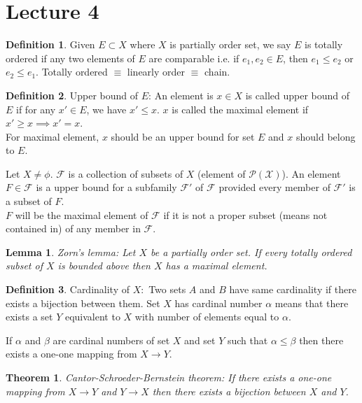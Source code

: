 \documentclass[12pt]{report}
\newtheorem{thm}{Theorem}
\newtheorem{lem}{Lemma}
\theoremstyle{definition}
\newtheorem{defn}{Definition}
\begin{document}
\section*{Lecture 4}
\begin{defn}
    Given $E \subset X$ where $X$ is partially order set, we say $E$ is totally ordered if any two elements of $E$ are comparable i.e. if $e_1,e_2 \in E$, then $e_1 \leq e_2$ or $e_2 \leq e_1$. Totally ordered $\equiv$ linearly order $\equiv$ chain.
\end{defn}
\begin{defn}
    Upper bound of $E$: An element is $x \in X$ is called upper bound of $E$ if for any $x' \in E$, we have $x' \leq x$. $x$ is called the maximal element if $x' \geq x \implies x' = x$.\\
    For maximal element, $x$ should be an upper bound for set $E$ and $x$ should belong to $E$.
\end{defn}
Let $X \neq \phi$. $\mathcal{F}$ is a collection of subsets of $X$ (element of $\mathcal{P(\text{X})}$). An element $F \in \mathcal{F}$ is a upper bound for a subfamily $\mathcal{F'}$ of $\mathcal{F}$ provided every member of $\mathcal{F'}$ is a subset of $F$.\\
$F$ will be the maximal element of $\mathcal{F}$ if it is not a proper subset (means not contained in) of any member in $\mathcal{F}$. 
\begin{lem}
    Zorn's lemma: Let $X$ be a partially order set. If every totally ordered subset of $X$ is bounded above then $X$ has a maximal element.
\end{lem}
\begin{defn}
    Cardinality of $X:$ Two sets $A$ and $B$ have same cardinality if there exists a bijection between them. Set $X$ has cardinal number $\alpha$ means that there exists a set $Y$ equivalent to $X$ with number of elements equal to $\alpha$.   
\end{defn}
If $\alpha$ and $\beta$ are cardinal numbers of set $X$ and set $Y$ such that $\alpha \leq \beta$ then there exists a one-one mapping from $X \to Y$.
\begin{thm}
    Cantor-Schroeder-Bernstein theorem: If there exists a one-one mapping from $X \to Y$ and $Y \to X$ then there exists a bijection between $X$ and $Y$.
\end{thm}
\end{document}
